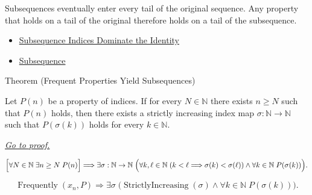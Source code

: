 \begin{remark*}[Interpretation]
Subsequences eventually enter every tail of the original sequence. Any
property that holds on a tail of the original therefore holds on a tail of
the subsequence.
\end{remark*}

\begin{dependencies}
\begin{itemize}
  \item \hyperref[thm:subsequence-indices-dominate-identity]{Subsequence Indices Dominate the Identity}
  \item \hyperref[def:subsequence]{Subsequence}
\end{itemize}
\end{dependencies}


\begin{theorembox}{Theorem (Frequent Properties Yield Subsequences)}
\begin{theorem}
\label{thm:frequent-properties-yield-subsequences}
Let $P(n)$ be a property of indices. If for every $N\in\mathbb{N}$ there
exists $n\ge N$ such that $P(n)$ holds, then there exists a strictly
increasing index map $\sigma:\mathbb{N}\to\mathbb{N}$ such that
$P(\sigma(k))$ holds for every $k\in\mathbb{N}$.

\smallskip
\noindent
\hyperref[prf:frequent-properties-yield-subsequences]{\textit{Go to proof.}}
\end{theorem}
\end{theorembox}

\begin{remark*}
\[
\Bigl[
\forall N\in\mathbb{N}\;\exists n\ge N\;P(n)
\Bigr]
\Longrightarrow
\exists \sigma:\mathbb{N}\to\mathbb{N}\;
\Bigl(
  \forall k,\ell\in\mathbb{N}\;(k<\ell\Longrightarrow\sigma(k)<\sigma(\ell))
  \land
  \forall k\in\mathbb{N}\;P(\sigma(k))
\Bigr).
\]
\end{remark*}

\begin{remark*}
\[
\operatorname{Frequently}(x_n,P)
\Longrightarrow
\exists \sigma\;\bigl(\operatorname{StrictlyIncreasing}(\sigma)
\land
\forall k\in\mathbb{N}\;P(\sigma(k))\bigr).
\]
\end{remark*}

